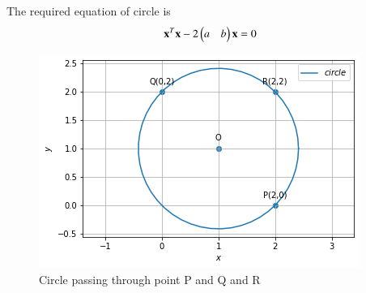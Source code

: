 The required equation of circle is 
\begin{align}
\mathbf{x}^T\mathbf{x}-2\begin{pmatrix}a&b\end{pmatrix}\mathbf{x} = 0
\end{align}
\begin{figure}[!ht]
\centering
\includegraphics[width=\columnwidth]{./solutions/4/1/4/5.png}
\caption{Circle passing through point P and Q and R}
\label{eq:solutions/4/1/4/Fig:5}
\end{figure}

